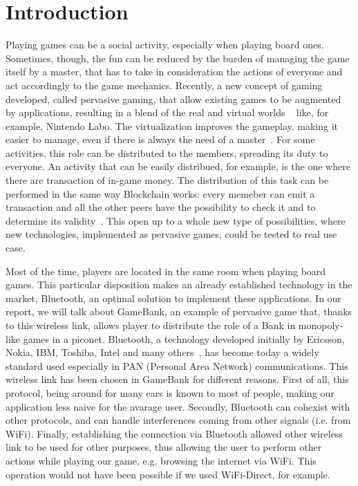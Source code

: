 \section{Introduction}

Playing games can be a social activity, especially when playing board ones. 
Sometimes, though, the fun can be reduced by the burden of managing the 
game itself by a master, that has to take in consideration the actions of 
everyone and act accordingly to the game mechanics. Recently, a new  concept of 
gaming developed, called pervasive gaming, that allow existing games to be 
augmented by applications, resulting in a blend of the real and virtual worlds 
~\cite{arango17} like, for example, Nintendo Labo.
The virtualization improves the gameplay, making it easier to manage, even if 
there is always the need of a master~\cite{bjork01}.
For some activities, this role can be distributed to the members, spreading its 
duty to everyone. An activity that can be easily distribued, for example, is the 
one where there are transaction of in-game money. The distribution of this task 
can be performed in the same way Blockchain works: every memeber can emit a 
transaction and all the other peers have the possibility to check it and to 
determine its validity~\cite{nakamoto08}. This open up to a whole new type of 
possibilities, where new technologies, implemented as pervasive games, could be 
tested to real use case.

Most of the time, players are located in the same room when playing board 
games. This particular disposition makes an already established technology in 
the market, Bluetooth, an optimal solution to implement these applications. In 
our report, we will talk about GameBank, an example of pervasive game that, 
thanks to this wireless link, allows player to distribute the role of a Bank in 
monopoly-like games in a piconet.
Bluetooth, a technology developed initially by Ericsson, Nokia, IBM, Toshiba, 
Intel and many others~\cite{haartsen00}, has become today a widely standard 
used especially in PAN (Personal Area Network) communications. This wireless 
link has been chosen in GameBank for different reasons. First of all, this 
protocol, being around for many ears is known to most of people, making our 
application less naive for the avarage user. Secondly, Bluetooth can cohexist 
with other protocols, and can handle interferences coming from other signals 
(i.e. from WiFi). Finally, establishing the connection via Bluetooth allowed 
other wireless link to be used for other purposes, thus allowing the user to 
perform other actions while playing our game, e.g. browsing the internet via 
WiFi. This operation would not have been possible if we used WiFi-Direct, for 
example.\\

